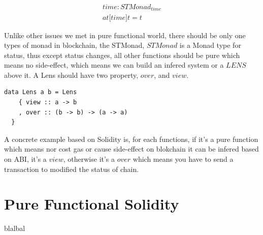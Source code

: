\documentclass[twocolumn]{article}
\begin{document}
\begin{gather}
  time: STMonad_{time}\\
  at \mathbb{[} time \mathbb{]}t = t
\end{gather}

Unlike other issues we met in pure functional world, there should be only one types of monad in blockchain, the STMonad, $STMonad$ is a Monad type for status, thus except status changes, all other functions should be pure which means no side-effect, which means we can build an infered system or a $LENS$\cite {lens} above it. A Lens should have two property, $over$, and $view$.

\lstset{language=Haskell}
\begin{lstlisting}
data Lens a b = Lens
    { view :: a -> b
    , over :: (b -> b) -> (a -> a)
  }
\end{lstlisting}

A concrete example based on Solidity is, for each functions, if it's a pure function which means nor cost gas or cause side-effect on blokchain it can be infered based on ABI, it's a $view$, otherwise it's a $over$ which means you have to send a transaction to modified the status of chain.


\section{Pure Functional Solidity}
blalbal



\end{document}
